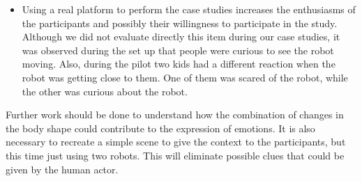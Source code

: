 \begin{itemize}
	\item Using a real platform to perform the case studies increases the enthusiasms of the participants and possibly their willingness to participate in the study. Although we did not evaluate directly this item during our case studies, it was observed during the set up that people were curious to see the robot moving. Also, during the pilot two kids had a different reaction when the robot was getting close to them. One of them was scared of the robot, while the other was curious about the robot.

\end{itemize}

Further work should be done to understand how the combination of changes in the body shape could contribute to the expression of emotions. It is also necessary to recreate a simple scene to give the context to the participants, but this time just using two robots. This will eliminate possible clues that could be given by the human actor.
